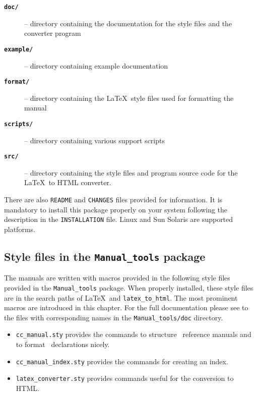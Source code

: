 \begin{description}
   \item[{\bf\tt doc/}] -- directory containing the documentation for
        the style files and the converter program
   \item[{\bf\tt example/}] -- directory containing example documentation
   \item[{\bf\tt format/}] -- directory containing the \LaTeX\ style files
        used for formatting the manual
   \item[{\bf\tt scripts/}] -- directory containing various support scripts
   \item[{\bf\tt src/}] -- directory containing the style files and program
        source code for the \LaTeX\ to HTML converter.
\end{description}

There are also \texttt{README} and \texttt{CHANGES} files provided for
information. It is mandatory to install this package properly on your
system following the description in the \texttt{INSTALLATION} file. Linux
and Sun Solaris are supported platforms.

\subsection{Style files in the \texttt{Manual\_tools} package}
\label{subsec:manual_tools_style_files}

The manuals are written with macros provided in the following style
files provided in the \texttt{Manual\_tools} package. When properly
installed, these style files are in the search paths of \LaTeX\ and
\texttt{latex\_to\_html}. The most prominent macros are introduced in
this chapter. For the full documentation please see to the files with
corresponding names in the \texttt{Manual\_tools/doc}
directory.

\begin{itemize}
   \item {\tt cc\_manual.sty}
       provides the commands to structure \CC\ reference manuals 
       and to format \CC\ declarations nicely.
   \item {\tt cc\_manual\_index.sty} provides the commands for creating an
       index.
   \item {\tt latex\_converter.sty}
       provides commands useful for the conversion to HTML.
\end{itemize}


